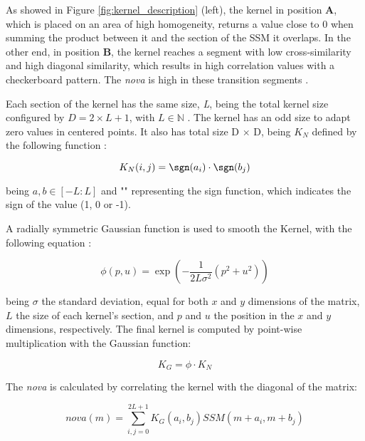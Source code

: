 As showed in Figure \ref{fig:kernel_description} (left), the kernel in position \textbf{A}, which is placed on an area of high homogeneity, returns a value close to $0$ when summing the product between it and the section of the \gls{SSM} it overlaps. In the other end, in position \textbf{B}, the kernel reaches a segment with low cross-similarity and high diagonal similarity, which results in high correlation values with a checkerboard pattern. The \textit{nova} is high in these transition segments \cite{Dannenberg2008, Mueller15_FMP_SPRINGER, MuellerZ19_FMP_ISMIR}.
\par
Each section of the kernel has the same size, \textit{L}, being the total kernel size configured by $D = 2 \times L + 1$, with $L \in \mathbb{N}$ . The kernel has an odd size to adapt zero values in centered points. It also has total size D $\times$ D, being $K_{N}$ defined by the following function \cite{Mueller15_FMP_SPRINGER, MuellerZ19_FMP_ISMIR}:

\begin{equation}
        K_N(i,j)  = \sgn(a_i) \cdot \sgn(b_j)
\end{equation}

being $a, b \in [-L:L]$ and "\sgn" representing the sign function, which indicates the sign of the value (1, 0 or -1).
\par
A radially symmetric Gaussian function is used to smooth the Kernel, with the following equation \cite{Mueller15_FMP_SPRINGER, MuellerZ19_FMP_ISMIR}:

\begin{equation}
    \phi(p,u) = \exp(-\frac{1}{2L\sigma^2}(p^2 + u^2))
\end{equation}

being $\sigma$ the standard deviation, equal for both $x$ and $y$ dimensions of the matrix, $L$ the size of each kernel's section, and $p$ and $u$ the position in the $x$ and $y$ dimensions, respectively. The final kernel is computed by point-wise multiplication with the Gaussian function:

\begin{equation}
    K_{G} = \phi \cdot K_{N}    
\end{equation}

The \textit{nova} is calculated by correlating the kernel with the diagonal of the matrix:

\begin{equation}
    nova(m) = \sum^{2L+1}_{i,j=0} K_{G}(a_i,b_j)SSM(m+a_i, m+b_j)
\end{equation}

